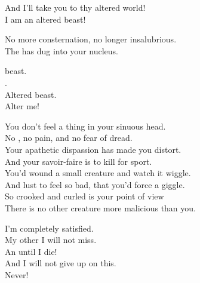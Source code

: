 And I'll take you to thy altered world! \\

I am an altered beast! \\





No more consternation, no longer insalubrious. \\
The   has dug into your nucleus. \\


 beast. \\
. \\
Altered beast. \\
Alter me! \\





You don't feel a thing in your sinuous head. \\
No , no pain, and no fear of dread. \\

Your apathetic dispassion has made you distort. \\
And your savoir-faire is to kill for sport. \\

You'd wound a small creature and watch it wiggle. \\
And lust to feel so bad, that you'd force a giggle. \\

So crooked and curled is your point of view \\
There is no other creature more malicious than you. \\


I'm completely satisfied. \\
My other  I will not miss. \\
An   until I die! \\
And I will not give up on this. \\
Never! \\

